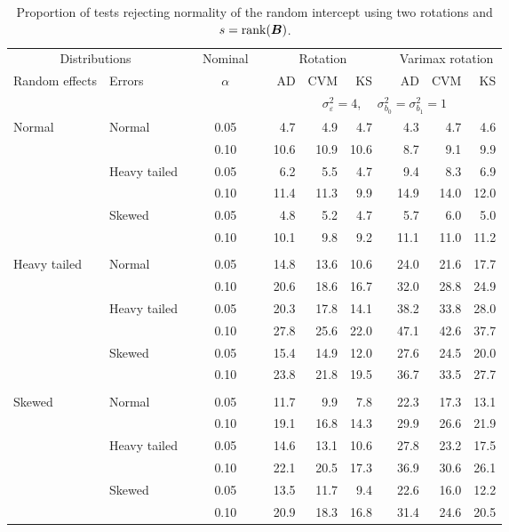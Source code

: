 \begin{table}[ht]
\centering
\caption{\label{tab:fixedsimb0sB} Proportion of tests rejecting normality of the random intercept using two rotations and $s = \operatorname{rank}(\bm{B})$.}
\begin{scriptsize}
\begin{tabular}{ll p{.1cm} c p{.1cm} rrr p{.1cm} rrr}
  \hline
  \multicolumn{2}{c}{Distributions}& & Nominal & &  \multicolumn{3}{c}{Rotation} & & \multicolumn{3}{c}{Varimax rotation} \\ \cline{1-2} \cline{6-8} \cline{10-12}   
  Random effects & Errors & & $\alpha$ & & AD & CVM & KS & & AD & CVM & KS \\ 
   \hline
& && && \multicolumn{7}{c}{$\sigma_{\varepsilon}^2 = 4$, \ \ $\sigma_{b_0}^2 = \sigma_{b_1}^2 = 1$} \\ \cline{6-12}
\rowcolor{gray!20} Normal & Normal &  & 0.05 &  & 4.7 & 4.9 & 4.7 &  & 4.3 & 4.7 & 4.6 \\ 
\rowcolor{gray!20}   &  &  & 0.10 &  & 10.6 & 10.9 & 10.6 &  & 8.7 & 9.1 & 9.9 \\ 
\rowcolor{gray!20}   & Heavy tailed &  & 0.05 &  & 6.2 & 5.5 & 4.7 &  & 9.4 & 8.3 & 6.9 \\ 
\rowcolor{gray!20}   &  &  & 0.10 &  & 11.4 & 11.3 & 9.9 &  & 14.9 & 14.0 & 12.0 \\ 
\rowcolor{gray!20}   & Skewed &  & 0.05 &  & 4.8 & 5.2 & 4.7 &  & 5.7 & 6.0 & 5.0 \\ 
\rowcolor{gray!20}   &  &  & 0.10 &  & 10.1 & 9.8 & 9.2 &  & 11.1 & 11.0 & 11.2 \\ 
&&&&&&&&&&&\\
  Heavy tailed & Normal &  & 0.05 &  & 14.8 & 13.6 & 10.6 &  & 24.0 & 21.6 & 17.7 \\ 
  &  &  & 0.10 &  & 20.6 & 18.6 & 16.7 &  & 32.0 & 28.8 & 24.9 \\ 
  & Heavy tailed &  & 0.05 &  & 20.3 & 17.8 & 14.1 &  & 38.2 & 33.8 & 28.0 \\ 
  &  &  & 0.10 &  & 27.8 & 25.6 & 22.0 &  & 47.1 & 42.6 & 37.7 \\ 
  & Skewed &  & 0.05 &  & 15.4 & 14.9 & 12.0 &  & 27.6 & 24.5 & 20.0 \\ 
  &  &  & 0.10 &  & 23.8 & 21.8 & 19.5 &  & 36.7 & 33.5 & 27.7 \\ 
&&&&&&&&&&&\\
  Skewed & Normal &  & 0.05 &  & 11.7 & 9.9 & 7.8 &  & 22.3 & 17.3 & 13.1 \\ 
   &  &  & 0.10 &  & 19.1 & 16.8 & 14.3 &  & 29.9 & 26.6 & 21.9 \\ 
   & Heavy tailed &  & 0.05 &  & 14.6 & 13.1 & 10.6 &  & 27.8 & 23.2 & 17.5 \\ 
   &  &  & 0.10 &  & 22.1 & 20.5 & 17.3 &  & 36.9 & 30.6 & 26.1 \\ 
   & Skewed &  & 0.05 &  & 13.5 & 11.7 & 9.4 &  & 22.6 & 16.0 & 12.2 \\ 
   &  &  & 0.10 &  & 20.9 & 18.3 & 16.8 &  & 31.4 & 24.6 & 20.5 \\ 



\end{tabular}
\end{scriptsize}
\end{table}
